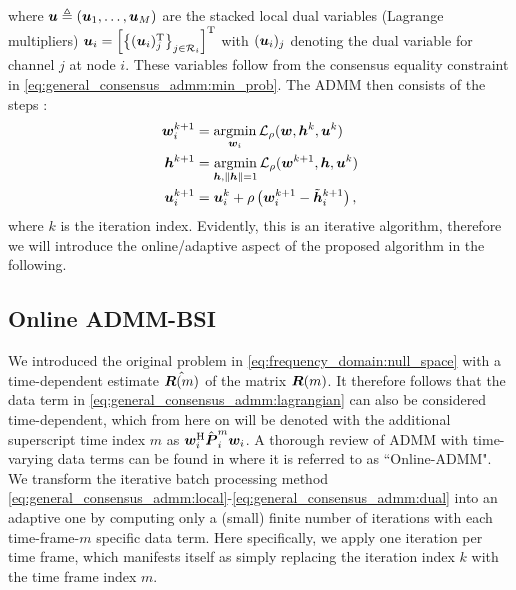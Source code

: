 \documentclass{article}
\begin{document}
where \({\bm{u}} \triangleq ({\bm{u}}_1,\ldots,{\bm{u}}_M)\) are the stacked local dual variables (Lagrange multipliers) \({\bm{u}}_i = \left[ \left\{ ({\bm{u}}_i)_j^{{\mathrm{T}}} \right\}_{j \in \mathcal{R}_i} \right]^{\mathrm{T}}\) with \(({\bm{u}}_i)_j\) denoting the dual variable for channel \(j\) at node \(i\).
These variables follow from the consensus equality constraint in \eqref{eq:general_consensus_admm:min_prob}.
The ADMM then consists of the steps \cite{boydDistributedOptimizationStatistical2011}:
\begin{align}
    {\bm{w}}_i^{k+1} &= \underset{{\bm{w}}_i}{\operatorname{argmin}} \, \mathcal{L}_{\rho} ({\bm{w}},{\bm{h}}^k,{\bm{u}}^k)\label{eq:general_consensus_admm:local}\\
    {\bm{h}}^{k+1} &= \underset{{\bm{h}}, \|{\bm{h}}\| = 1}{\operatorname{argmin}}\, \mathcal{L}_{\rho} ({\bm{w}}^{k+1},{\bm{h}},{\bm{u}}^k)\label{eq:general_consensus_admm:global}\\
    {\bm{u}}_i^{k+1} &= {\bm{u}}_i^{k} + \rho \left( {\bm{w}}_i^{k+1} - \tilde{{\bm{h}}}_i^{k+1} \right),\label{eq:general_consensus_admm:dual}
\end{align}
where \(k\) is the iteration index. Evidently, this is an iterative algorithm, therefore we will introduce the online/adaptive aspect of the proposed algorithm in the following.

\subsection{Online ADMM-BSI}
\label{ssec:online_admm}
We introduced the original problem in \eqref{eq:frequency_domain:null_space} with a time-dependent estimate \(\hat{{\bm{{R}}}(m)}\) of the matrix \({\bm{{R}}}(m)\). It therefore follows that the data term in \eqref{eq:general_consensus_admm:lagrangian} can also be considered time-dependent, which from here on will be denoted with the additional superscript time index \(m\) as \({\bm{w}}_i^{\mathrm{H}} \hat{{\bm{{P}}}}_i^{m} {\bm{w}}_i\).
A thorough review of ADMM with time-varying data terms can be found in \cite{wangOnlineAlternatingDirection2013,hosseiniOnlineDistributedADMM2014} where it is referred to as ``Online-ADMM".
We transform the iterative batch processing method \eqref{eq:general_consensus_admm:local}-\eqref{eq:general_consensus_admm:dual} into an adaptive one by computing only a (small) finite number of iterations with each time-frame-\(m\) specific data term.
Here specifically, we apply one iteration per time frame, which manifests itself as simply replacing the iteration index \(k\) with the time frame index \(m\).
\end{document}
